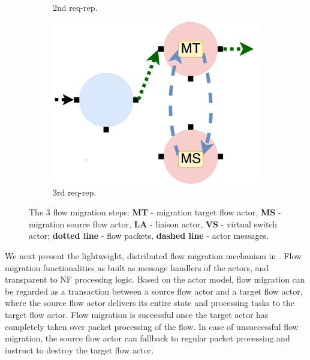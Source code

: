 \begin{figure}[!t]
\begin{subfigure}[t]{0.33\linewidth}
     \caption{2nd req-rep.}\label{fig:mig2}
    \end{subfigure}\hfill
  \begin{subfigure}[t]{0.33\linewidth}
 \centering
   \includegraphics[width=\columnwidth]{figure/nfactor-mig3.pdf}
   \caption{3rd req-rep.}\label{fig:mig3} \end{subfigure}\hfill
 \caption{The 3 flow migration steps: \textbf{MT} - migration target flow actor, \textbf{MS} - migration source flow actor, \textbf{LA} - liaison actor, \textbf{VS} - virtual switch actor; \textbf{dotted line} - flow packets, \textbf{dashed line} - actor messages.}
\label{fig:mig}
\end{figure}

We next present the lightweight, distributed flow migration mechanism in \nfactor. Flow migration functionalities as built as message handlers of the actors, and transparent to NF processing logic. Based on the actor model, flow migration can be regarded as a transaction between a source flow actor and a target flow actor, where the source flow actor delivers its entire state and processing tasks to the target flow actor. Flow migration is successful once the target actor has completely taken over packet processing of the flow. %
 In case of unsuccessful flow migration, the source flow actor can fallback to regular packet processing and instruct to destroy the target flow actor.
 
